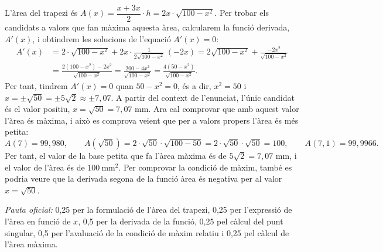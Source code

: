 \begin{apartats}
\begin{solucio}
L'àrea del trapezi és $A(x)=\dfrac{x+3x}{2}\cdot h=2x\cdot\sqrt{100-x^2}$. Per trobar els candidats a valors que fan
màxima aquesta àrea, calcularem la funció derivada, $A'(x)$, i obtindrem les solucions de l'equació $A'(x)=0$:
\begin{align*}
A'(x)&=2\cdot\sqrt{100-x^2}+2x\cdot\frac{1}{2\sqrt{100-x^2}}\,(-2x)
=2\sqrt{100-x^2}+\frac{-2x^2}{\sqrt{100-x^2}}\\
&=\frac{2\left(100-x^2\right)-2x^2}{\sqrt{100-x^2}}=\frac{200-4x^2}{\sqrt{100-x^2}}=\frac{4\left(50-x^2\right)}{\sqrt{100-x^2}}.
\end{align*}
Per tant, tindrem $A'(x)=0$ quan $50-x^2=0$, és a dir, $x^2=50$ i $x=\pm\sqrt{50}=\pm5\sqrt2\approx\pm7{,}07$. A
partir del context de l'enunciat, l'únic candidat és el valor positiu, $x=\sqrt{50}=7{,}07$ mm. Ara cal comprovar
que amb aquest valor l'àrea és màxima, i això es comprova veient que per a valors propers l'àrea és més petita:
\[
A(7)=99{,}980,\qquad A\!\left(\sqrt{50}\right)=2\cdot\sqrt{50}\cdot\sqrt{100-50}=2\cdot\sqrt{50}\cdot\sqrt{50}=100,\qquad
A(7{,}1)=99{,}9966 .
\]
Per tant, el valor de la base petita que fa l'àrea màxima és de $5\sqrt2=7{,}07$ mm, i el valor de l'àrea és de
$100\ \text{mm}^2$. Per comprovar la condició de màxim, també es podria veure que la derivada segona de la funció
àrea és negativa per al valor $x=\sqrt{50}$.

\textit{Pauta oficial:} 0,25 per la formulació de l'àrea del trapezi, 0,25 per l'expressió de l'àrea en funció de
$x$, 0,5 per la derivada de la funció, 0,25 pel càlcul del punt singular, 0,5 per l'avaluació de la condició de
màxim relatiu i 0,25 pel càlcul de l'àrea màxima.
\end{solucio}

\end{apartats}
